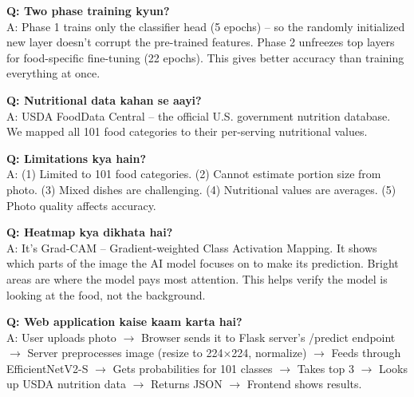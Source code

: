 \documentclass[11pt,a4paper]{article}
\begin{document}
\begin{qabox}
\textbf{Q: Two phase training kyun?}\\[0.15cm]
A: Phase 1 trains only the classifier head (5 epochs) -- so the randomly initialized new layer doesn't corrupt the pre-trained features. Phase 2 unfreezes top layers for food-specific fine-tuning (22 epochs). This gives better accuracy than training everything at once.
\end{qabox}
\vspace{0.2cm}

\begin{qabox}
\textbf{Q: Nutritional data kahan se aayi?}\\[0.15cm]
A: USDA FoodData Central -- the official U.S. government nutrition database. We mapped all 101 food categories to their per-serving nutritional values.
\end{qabox}
\vspace{0.2cm}

\begin{qabox}
\textbf{Q: Limitations kya hain?}\\[0.15cm]
A: (1) Limited to 101 food categories. (2) Cannot estimate portion size from photo. (3) Mixed dishes are challenging. (4) Nutritional values are averages. (5) Photo quality affects accuracy.
\end{qabox}
\vspace{0.2cm}

\begin{qabox}
\textbf{Q: Heatmap kya dikhata hai?}\\[0.15cm]
A: It's Grad-CAM -- Gradient-weighted Class Activation Mapping. It shows which parts of the image the AI model focuses on to make its prediction. Bright areas are where the model pays most attention. This helps verify the model is looking at the food, not the background.
\end{qabox}
\vspace{0.2cm}

\begin{qabox}
\textbf{Q: Web application kaise kaam karta hai?}\\[0.15cm]
A: User uploads photo $\rightarrow$ Browser sends it to Flask server's /predict endpoint $\rightarrow$ Server preprocesses image (resize to 224$\times$224, normalize) $\rightarrow$ Feeds through EfficientNetV2-S $\rightarrow$ Gets probabilities for 101 classes $\rightarrow$ Takes top 3 $\rightarrow$ Looks up USDA nutrition data $\rightarrow$ Returns JSON $\rightarrow$ Frontend shows results.
\end{qabox}
\vspace{0.2cm}
\end{document}
